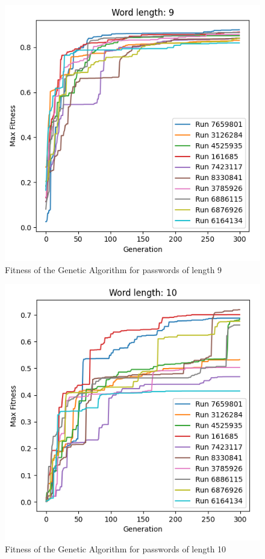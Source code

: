 \documentclass[sigconf,authordraft]{acmart}
\begin{document}
\begin{figure}
  \includegraphics[width=\columnwidth]{genetic_results_9.png}
  \caption{Fitness of the Genetic Algorithm for passwords of length 9}
  \label{fig:fitness_genetic_9}
\end{figure}

\begin{figure}
  \includegraphics[width=\columnwidth]{genetic_results_10.png}
  \caption{Fitness of the Genetic Algorithm for passwords of length 10}
  \label{fig:fitness_genetic_10}
\end{figure}
\end{document}

